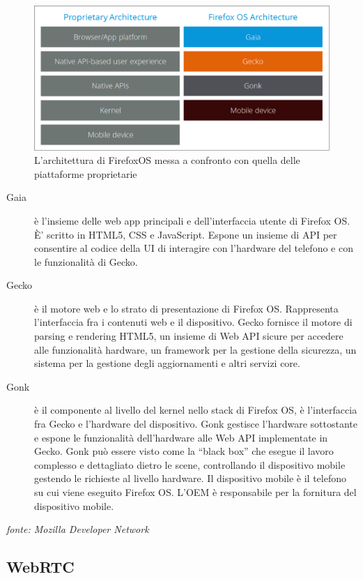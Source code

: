 \begin{figure}[h]
	\begin{center}
		\includegraphics[scale=0.30]{Figures/fxos-general-architecture-match.png}
		\caption[Architettura di FirefoxOS]{L'architettura di FirefoxOS messa a confronto con quella delle piattaforme proprietarie}
		\label{fig:fxos_architecture}
	\end{center}
\end{figure}

\begin{description}
	\item[Gaia] è l'insieme delle web app principali e dell'interfaccia utente di Firefox OS. È' scritto in HTML5, CSS e JavaScript. Espone un insieme di API per consentire al codice della UI di interagire con l'hardware del telefono e con le funzionalità di Gecko.
	\item[Gecko] è il motore web e lo strato di presentazione di Firefox OS. Rappresenta l'interfaccia fra i contenuti web e il dispositivo. Gecko fornisce il motore di parsing e rendering HTML5, un insieme di Web API sicure per accedere alle funzionalità hardware, un framework per la gestione della sicurezza, un sistema per la gestione degli aggiornamenti e altri servizi core.
	\item[Gonk] è il componente al livello del kernel nello stack di Firefox OS, è l'interfaccia fra Gecko e l'hardware del dispositivo. Gonk gestisce l'hardware sottostante e espone le funzionalità dell'hardware alle Web API implementate in Gecko. Gonk può essere visto come la “black box” che esegue il lavoro complesso e dettagliato dietro le scene, controllando il dispositivo mobile gestendo le richieste al livello hardware.
	Il dispositivo mobile è il telefono su cui viene eseguito Firefox OS. L'OEM è responsabile per la fornitura del dispositivo mobile.
\end{description}
\emph{fonte: Mozilla Developer Network}\cite{mdn:fxos}


\subsection{WebRTC}